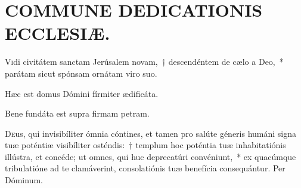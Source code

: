 \documentclass[vesperale_romanum.tex]{subfiles}
\begin{document}
\section[Commune Dedicationis Ecclesiæ]{COMMUNE DEDICATIONIS ECCLESIÆ.}

\thispagestyle{empty}









\label{cap_ded_ecc}

\lettrine{V}{i}di civitátem sanctam Jerúsalem novam,~† descendéntem de cælo a Deo,~* parátam sicut spónsam ornátam viro suo.

 \label{caelestis_urbs_jerusalem}


\vv Hæc est domus Dómini fírmiter ædificáta.

\rr Bene fundáta est supra firmam petram.


\oratio


\lettrine{D}{e}us, qui invisibíliter ómnia cóntines, et tamen pro salúte géneris humáni signa tuæ poténtiæ visibíliter osténdis:~† templum hoc poténtia tuæ inhabitatiónis illústra, et concéde; ut omnes, qui huc deprecatúri convéniunt,~* ex quacúmque tribulatióne ad te clamáverint, consolatiónis tuæ benefícia consequántur. Per Dóminum.
\end{document}
